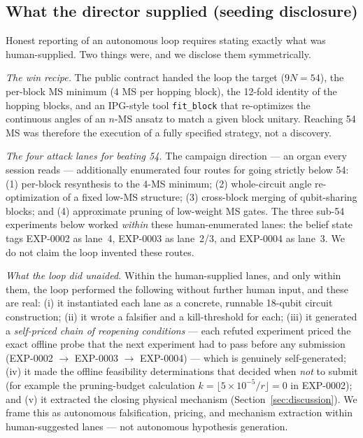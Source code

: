 \documentclass[11pt]{article}
\begin{document}
\subsection{What the director supplied (seeding disclosure)}
\label{sec:seeding}

Honest reporting of an autonomous loop requires stating exactly what was
human-supplied. Two things were, and we disclose them symmetrically.

\emph{The win recipe.} The public contract handed the loop the target ($9N = 54$),
the per-block MS minimum (4 MS per hopping block), the 12-fold identity of the
hopping blocks, and an IPG-style tool \texttt{fit\_block} that re-optimizes the
continuous angles of an $n$-MS ansatz to match a given block unitary. Reaching 54 MS
was therefore the execution of a fully specified strategy, not a discovery.

\emph{The four attack lanes for beating 54.} The campaign direction --- an organ every
session reads --- additionally enumerated four routes for going strictly below 54:
(1) per-block resynthesis to the 4-MS minimum; (2) whole-circuit angle
re-optimization of a fixed low-MS structure; (3) cross-block merging of
qubit-sharing blocks; and (4) approximate pruning of low-weight MS gates. The three
sub-54 experiments below worked \emph{within} these human-enumerated lanes: the
belief state tags EXP-0002 as lane~4, EXP-0003 as lane~2/3, and EXP-0004 as lane~3.
We do not claim the loop invented these routes.

\emph{What the loop did unaided.} Within the human-supplied lanes, and only within
them, the loop performed the following without further human input, and these are
real: (i) it instantiated each lane as a concrete, runnable 18-qubit circuit
construction; (ii) it wrote a falsifier and a kill-threshold for each; (iii) it
generated a \emph{self-priced chain of reopening conditions} --- each refuted
experiment priced the exact offline probe that the next experiment had to pass
before any submission (EXP-0002 $\to$ EXP-0003 $\to$ EXP-0004) --- which is
genuinely self-generated; (iv) it made the offline feasibility determinations that
decided when \emph{not} to submit (for example the pruning-budget calculation
$k = \lfloor 5\times10^{-5}/r\rfloor = 0$ in EXP-0002); and (v) it extracted the
closing physical mechanism (Section~\ref{sec:discussion}). We frame this as
autonomous falsification, pricing, and mechanism extraction within human-suggested
lanes --- not autonomous hypothesis generation.
\end{document}
